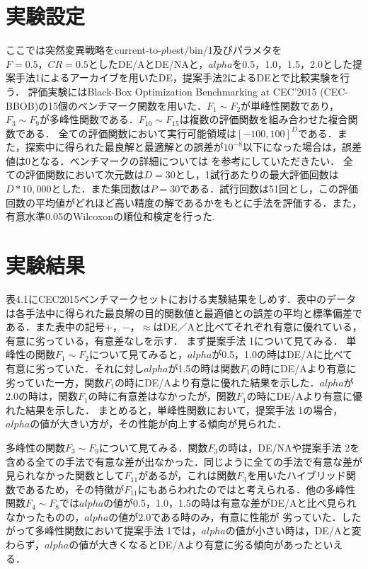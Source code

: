 \documentclass[a4paper,11pt,oneside,openany]{jsbook}
\begin{document}
\section{実験設定}
ここでは突然変異戦略をcurrent-to-$p$best/bin/1及びパラメタを$F=0.5，CR=0.5$としたDE/AとDE/NAと，$alpha$を0.5，1.0，1.5，2.0とした提案手法1によるアーカイブを用いたDE，提案手法2によるDEとで比較実験を行う．
評価実験にはBlack-Box Optimization Benchmarking at CEC'2015 (CEC-BBOB)の15個のベンチマーク関数を用いた．$F_{1}{\sim}F_{2}$が単峰性関数であり，$F_3{\sim}F_9$が多峰性関数である．$F_{10}{\sim}F_{15}$は複数の評価関数を組み合わせた複合関数である．
全ての評価関数において実行可能領域は$[-100,100]^D$である．また，探索中に得られた最良解と最適解との誤差が$10^{-8}$以下になった場合は，誤差値は0となる．ベンチマークの詳細については \cite{CEC2015} を参考にしていただきたい．
全ての評価関数において次元数は$D=30$とし，1試行あたりの最大評価回数は$D*10,000$とした．また集団数は$P=30$である．試行回数は51回とし，この評価回数の平均値がどれほど高い精度の解であるかをもとに手法を評価する．また，有意水準0.05のWilcoxonの順位和検定を行った.


\section{実験結果}
表4.1にCEC2015ベンチマークセットにおける実験結果をしめす．表中のデータは各手法中に得られた最良解の目的関数値と最適値との誤差の平均と標準偏差である．また表中の記号+，−，$\approx$はDE／Aと比べてそれぞれ有意に優れている，有意に劣っている，有意差なしを示す．
まず提案手法 1について見てみる．
単峰性の関数$F_{1}{\sim}F_{2}$について見てみると，$alpha$が0.5，1.0の時はDE/Aに比べて有意に劣っていた．それに対し$alpha$が1.5の時は関数$F_{1}$の時にDE/Aより有意に劣っていた一方，関数$F_{1}$の時にDE/Aより有意に優れた結果を示した．$alpha$が2.0の時は，関数$F_{1}$の時に有意差はなかったが，関数$F_{1}$の時にDE/Aより有意に優れた結果を示した．
まとめると，単峰性関数において，提案手法 1の場合，$alpha$の値が大きい方が，その性能が向上する傾向が見られた．

多峰性の関数$F_{3}{\sim}F_{9}$について見てみる．関数$F_{3}$の時は，DE/NAや提案手法 2を含める全ての手法で有意な差が出なかった．同じように全ての手法で有意な差が見られなかった関数として$F_{11}$があるが，これは関数$F_{3}$を用いたハイブリッド関数であるため，その特徴が$F_{11}$にもあらわれたのではと考えられる．他の多峰性関数$F_{4}{\sim}F_{8}$では$alpha$の値が0.5，1.0，1.5の時は有意な差がDE/Aと比べ見られなかったものの，$alpha$の値が2.0である時のみ，有意に性能が
劣っていた．したがって多峰性関数において提案手法 1では，$alpha$の値が小さい時は，DE/Aと変わらず，$alpha$の値が大きくなるとDE/Aより有意に劣る傾向があったといえる．
\end{document}
